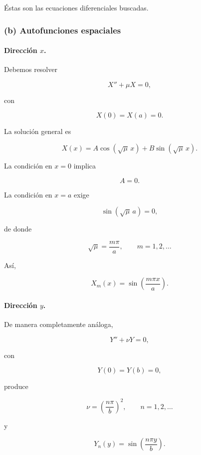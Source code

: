 \documentclass[11pt,spanish]{article}
\begin{document}
Éstas son las ecuaciones diferenciales buscadas.

\subsubsection*{(b) Autofunciones espaciales}

\paragraph{Dirección $x$.}

Debemos resolver

\[
X''+\mu X=0,
\]

con

\[
X(0)=X(a)=0.
\]

La solución general es

\[
X(x)=A\cos(\sqrt{\mu}\,x)
+
B\sin(\sqrt{\mu}\,x).
\]

La condición en $x=0$ implica

\[
A=0.
\]

La condición en $x=a$ exige

\[
\sin(\sqrt{\mu}\,a)=0,
\]

de donde

\begin{equation}
\sqrt{\mu}
=
\frac{m\pi}{a},
\qquad
m=1,2,\ldots
\end{equation}

Así,

\begin{equation}
X_m(x)
=
\sin\!\left(\frac{m\pi x}{a}\right).
\end{equation}

\paragraph{Dirección $y$.}

De manera completamente análoga,

\[
Y''+\nu Y=0,
\]

con

\[
Y(0)=Y(b)=0,
\]

produce

\begin{equation}
\nu
=
\left(\frac{n\pi}{b}\right)^2,
\qquad
n=1,2,\ldots
\end{equation}

y

\begin{equation}
Y_n(y)
=
\sin\!\left(\frac{n\pi y}{b}\right).
\end{equation}
\end{document}

